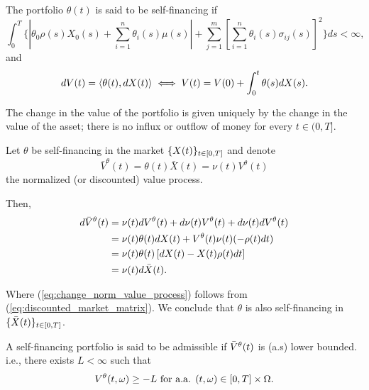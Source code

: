 \documentclass[../TGMAFFIRO.tex]{subfiles}
\begin{document}
\begin{definition}
	The portfolio $\theta(t)$ is said to be self-financing if
	\begin{equation}
	\int_0^T\{|\theta_0\rho(s)X_0(s) + \sum_{i=1}^{n}\theta_i(s)\mu(s)| + \sum_{j=1}^m\left[\sum_{i=1}^n\theta_i(s)\sigma_{ij}(s)\right]^2\} ds < \infty,
	\end{equation}
and 
\begin{equation}
  dV(t) = \langle \theta(t), dX(t)\rangle \iff V(t) = V(0)  + \int_0^t \theta(s) dX(s).
\end{equation}

The change in the value of the portfolio is given uniquely by the change in the value of the asset; there is no influx or outflow of money for every $t\in(0,T]$.
\end{definition}

\begin{remark}
	Let $\theta$ be self-financing in the market $\{X(t)\}_{t\in[0,T]}$ and denote
	\begin{equation}
		\bar V^\theta(t) = \theta(t)\bar X(t) = \nu(t) V^\theta(t)
	\end{equation}
the normalized (or discounted) value process.

Then,
\begin{align}
	d\bar{V}^\theta(t	) &= \nu(t) dV^\theta(t) + d\nu(t) V^\theta(t) + d\nu(t) dV^\theta(t)\nonumber\\
	&= \nu(t)\theta(t)dX(t) + V^\theta(t)\nu(t)(-\rho(t)dt)\nonumber\\
	&= \nu(t)\theta(t)\left[dX(t) - X(t)\rho(t)dt\right]\nonumber\\
	&= \nu(t)d\bar{X}(t).\label{eq:change_norm_value_process}
\end{align}

Where (\ref{eq:change_norm_value_process}) follows from (\ref{eq:discounted_market_matrix}). We conclude that $\theta$ is also self-financing in $\{\bar{X}(t)\}_{t\in[0,T]}$.
\end{remark}


\begin{definition}
	A self-financing portfolio is said to be admissible if $\bar{V}^\theta(t)$ is (a.s) lower bounded. i.e., there exists $L < \infty$ such that
	\begin{equation}
		V^\theta(t, \omega)  \geq -L \ \text{for a.a. } (t,\omega) \in [0,T]\times \Omega.
	\end{equation}
\end{definition}
\end{document}
